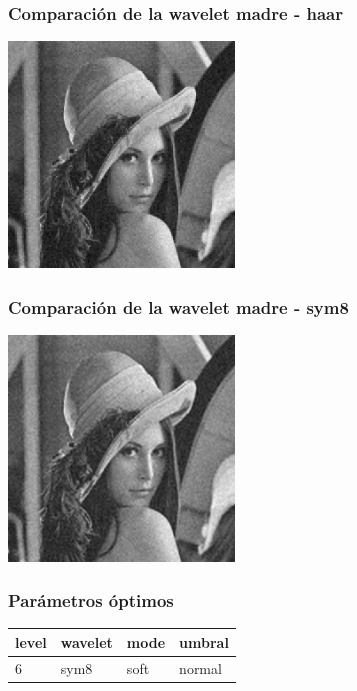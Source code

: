 \documentclass{beamer}
\begin{document}
  \begin{frame}
    \frametitle{Comparación de la wavelet madre - haar}
    
    \centering
    
    \includegraphics[width=6cm]{imgs/Wavelets/2_normal_soft_haar_Lenna.jpg}
    

  
  \end{frame}

  \begin{frame}
    \frametitle{Comparación de la wavelet madre - sym8}
    
    \centering
    
    
    \includegraphics[width=6cm]{imgs/Wavelets/2_normal_soft_sym8_Lenna.jpg}

  
  \end{frame}

  \begin{frame}
    \frametitle{Parámetros óptimos}
    \centering
    \begin{tabular}{llll}
      \toprule
      level & wavelet & mode & umbral \\
      \midrule 
      6 & sym8 & soft & normal \\
      \bottomrule
    \end{tabular}
  
  \end{frame}
\end{document}

